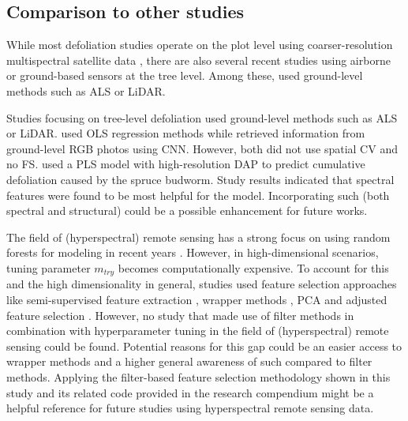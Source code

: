 \documentclass[journal]{IEEEtran}
\begin{document}
\subsection{Comparison to other studies}

While most defoliation studies operate on the plot level using coarser-resolution multispectral satellite data \cite{townsend2012, debeurs2008, rengarajan2016}, there are also several recent studies using airborne or ground-based sensors at the tree level.
Among these, \cite{meng2018, kalin2019} used ground-level methods such as \ac{ALS} or \ac{LiDAR}.

Studies focusing on tree-level defoliation used ground-level methods such as \ac{ALS} or \ac{LiDAR}\cite{meng2018, kalin2019}.
\cite{meng2018} used \ac{OLS} regression methods while \cite{kalin2019} retrieved information from ground-level RGB photos using \ac{CNN}.
However, both did not use spatial \ac{CV} and \cite{kalin2019} no \ac{FS}.
\cite{goodbody2018} used a \ac{PLS} model with high-resolution \ac{DAP} to predict cumulative defoliation caused by the spruce budworm.
Study results indicated that spectral features were found to be most helpful for the model.
Incorporating such (both spectral and structural) could be a possible enhancement for future works.

The field of (hyperspectral) remote sensing has a strong focus on using random forests for modeling in recent years \cite{belgiu2016}.
However, in high-dimensional scenarios, tuning parameter \texttt{\(m_{try}\)} becomes computationally expensive.
To account for this and the high dimensionality in general, studies used feature selection approaches like semi-supervised feature extraction \cite{xia2015}, wrapper methods \cite{fassnacht2014a, feng2016, georganos2018}, PCA and adjusted feature selection \cite{rochac2016}.
However, no study that made use of filter methods in combination with hyperparameter tuning in the field of (hyperspectral) remote sensing could be found.
Potential reasons for this gap could be an easier access to wrapper methods and a higher general awareness of such compared to filter methods.
Applying the filter-based feature selection methodology shown in this study and its related code provided in the research compendium might be a helpful reference for future studies using hyperspectral remote sensing data.
\end{document}

